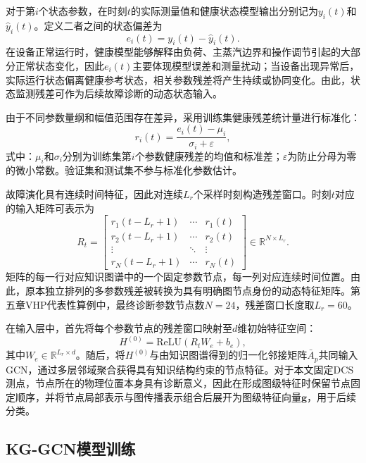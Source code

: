 对于第$i$个状态参数，在时刻$t$的实际测量值和健康状态模型输出分别记为$y_i(t)$和$\hat y_i(t)$。定义二者之间的状态偏差为
\begin{equation}
e_i(t)=y_i(t)-\hat y_i(t).
\end{equation}
在设备正常运行时，健康模型能够解释由负荷、主蒸汽边界和操作调节引起的大部分正常状态变化，因此$e_i(t)$主要体现模型误差和测量扰动；当设备出现异常后，实际运行状态偏离健康参考状态，相关参数残差将产生持续或协同变化。由此，状态监测残差可作为后续故障诊断的动态状态输入。

由于不同参数量纲和幅值范围存在差异，采用训练集健康残差统计量进行标准化：
\begin{equation}
r_i(t)=\frac{e_i(t)-\mu_i}{\sigma_i+\varepsilon},
\end{equation}
式中：$\mu_i$和$\sigma_i$分别为训练集第$i$个参数健康残差的均值和标准差；$\varepsilon$为防止分母为零的微小常数。验证集和测试集不参与标准化参数估计。

故障演化具有连续时间特征，因此对连续$L_r$个采样时刻构造残差窗口。时刻$t$对应的输入矩阵可表示为
\begin{equation}
R_t=
\begin{bmatrix}
r_1(t-L_r+1)&\cdots&r_1(t)\\
r_2(t-L_r+1)&\cdots&r_2(t)\\
\vdots&\ddots&\vdots\\
r_N(t-L_r+1)&\cdots&r_N(t)
\end{bmatrix}
\in\mathbb{R}^{N\times L_r}.
\end{equation}
矩阵的每一行对应知识图谱中的一个固定参数节点，每一列对应连续时间位置。由此，原本独立排列的多参数残差被转换为具有明确图节点身份的动态特征矩阵。第五章VHP代表性算例中，最终诊断参数节点数$N=24$，残差窗口长度取$L_r=60$。

在输入层中，首先将每个参数节点的残差窗口映射至$d$维初始特征空间：
\begin{equation}
H^{(0)}=\mathrm{ReLU}(R_tW_e+b_e),
\end{equation}
其中$W_e\in\mathbb{R}^{L_r\times d}$。随后，将$H^{(0)}$与由知识图谱得到的归一化邻接矩阵$\bar A_p$共同输入GCN，通过多层邻域聚合获得具有知识结构约束的节点特征。对于本文固定DCS测点，节点所在的物理位置本身具有诊断意义，因此在形成图级特征时保留节点固定顺序，并将节点局部表示与图传播表示组合后展开为图级特征向量$\mathbf g$，用于后续分类。

\subsection{KG-GCN模型训练}
\label{subsec:kg_training_v4}

